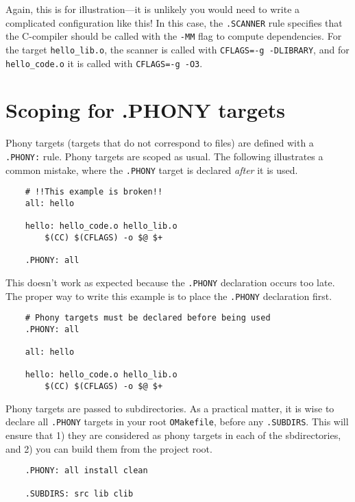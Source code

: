 Again, this is for illustration---it is unlikely you would need to write a complicated configuration
like this!  In this case, the \verb+.SCANNER+ rule specifies that the C-compiler should be called
with the \verb+-MM+ flag to compute dependencies.  For the target \verb+hello_lib.o+, the scanner
is called with \verb+CFLAGS=-g -DLIBRARY+, and for \verb+hello_code.o+ it is called with
\verb+CFLAGS=-g -O3+.

\section{Scoping for .PHONY targets}

Phony targets (targets that do not correspond to files) are defined with a \verb+.PHONY:+ rule.
Phony targets are scoped as usual.  The following illustrates a common mistake, where the
\verb+.PHONY+ target is declared \emph{after} it is used.

\begin{verbatim}
    # !!This example is broken!!
    all: hello

    hello: hello_code.o hello_lib.o
        $(CC) $(CFLAGS) -o $@ $+

    .PHONY: all
\end{verbatim}

This doesn't work as expected because the \verb+.PHONY+ declaration occurs too late.  The proper way
to write this example is to place the \verb+.PHONY+ declaration first.

\begin{verbatim}
    # Phony targets must be declared before being used
    .PHONY: all

    all: hello

    hello: hello_code.o hello_lib.o
        $(CC) $(CFLAGS) -o $@ $+
\end{verbatim}

Phony targets are passed to subdirectories.  As a practical matter, it is wise to declare all
\verb+.PHONY+ targets in your root \verb+OMakefile+, before any \verb+.SUBDIRS+.  This will ensure
that 1) they are considered as phony targets in each of the sbdirectories, and 2) you can build them
from the project root.

\begin{verbatim}
    .PHONY: all install clean

    .SUBDIRS: src lib clib
\end{verbatim}

